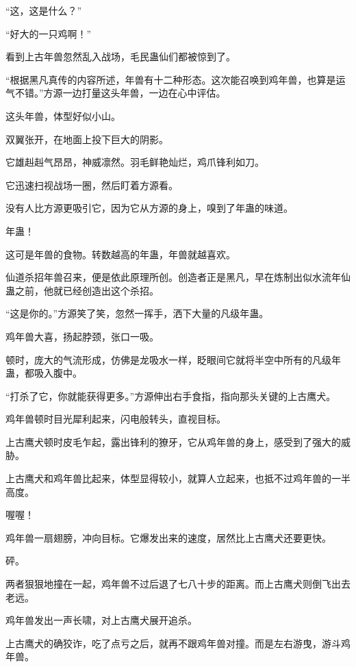 
\begin{this_body}



“这，这是什么？”

“好大的一只鸡啊！”

看到上古年兽忽然乱入战场，毛民蛊仙们都被惊到了。

“根据黑凡真传的内容所述，年兽有十二种形态。这次能召唤到鸡年兽，也算是运气不错。”方源一边打量这头年兽，一边在心中评估。

这头年兽，体型好似小山。

双翼张开，在地面上投下巨大的阴影。

它雄赳赳气昂昂，神威凛然。羽毛鲜艳灿烂，鸡爪锋利如刀。

它迅速扫视战场一圈，然后盯着方源看。

没有人比方源更吸引它，因为它从方源的身上，嗅到了年蛊的味道。

年蛊！

这可是年兽的食物。转数越高的年蛊，年兽就越喜欢。

仙道杀招年兽召来，便是依此原理所创。创造者正是黑凡，早在炼制出似水流年仙蛊之前，他就已经创造出这个杀招。

“这是你的。”方源笑了笑，忽然一挥手，洒下大量的凡级年蛊。

鸡年兽大喜，扬起脖颈，张口一吸。

顿时，庞大的气流形成，仿佛是龙吸水一样，眨眼间它就将半空中所有的凡级年蛊，都吸入腹中。

“打杀了它，你就能获得更多。”方源伸出右手食指，指向那头关键的上古鹰犬。

鸡年兽顿时目光犀利起来，闪电般转头，直视目标。

上古鹰犬顿时皮毛乍起，露出锋利的獠牙，它从鸡年兽的身上，感受到了强大的威胁。

上古鹰犬和鸡年兽比起来，体型显得较小，就算人立起来，也抵不过鸡年兽的一半高度。

喔喔！

鸡年兽一扇翅膀，冲向目标。它爆发出来的速度，居然比上古鹰犬还要更快。

砰。

两者狠狠地撞在一起，鸡年兽不过后退了七八十步的距离。而上古鹰犬则倒飞出去老远。

鸡年兽发出一声长啸，对上古鹰犬展开追杀。

上古鹰犬的确狡诈，吃了点亏之后，就再不跟鸡年兽对撞。而是左右游曳，游斗鸡年兽。


\end{this_body}
